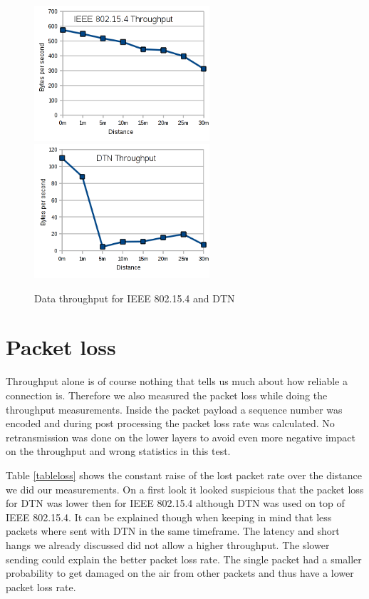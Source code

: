 \begin{figure}
  \begin{center}
    \includegraphics[width=6.5cm]{images/throughput_802154}
    \includegraphics[width=6.5cm]{images/throughput_dtn}
    \caption{Data throughput for IEEE 802.15.4 and DTN}
    \label{fig:throughput}
  \end{center}
\end{figure}

\section{Packet loss}
Throughput alone is of course nothing that tells us much about how reliable a
connection is. Therefore we also measured the packet loss while doing the
throughput measurements. Inside the packet payload a sequence number was encoded
and during post processing the packet loss rate was calculated. No retransmission
was done on the lower layers to avoid even more negative impact on the
throughput and wrong statistics in this test.

Table \ref{tableloss} shows the constant raise of the lost packet rate over the
distance we did our measurements. On a first look it looked suspicious that the
packet loss for DTN was lower then for IEEE 802.15.4 although DTN was used on top
of IEEE 802.15.4. It can be explained though when keeping in mind that less
packets where sent with DTN in the same timeframe. The latency and short hangs
we already discussed did not allow a higher throughput. The slower sending could
explain the better packet loss rate. The single packet had a smaller probability
to get damaged on the air from other packets and thus have a lower packet loss
rate.

